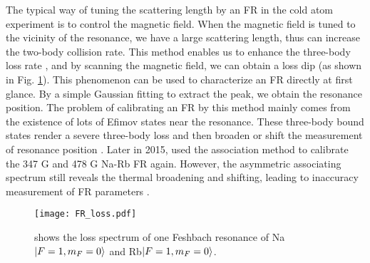 The typical way of tuning the scattering length by an FR in the cold atom experiment is to control the magnetic field. When the magnetic field is tuned to the vicinity of the resonance, we have a large scattering length, thus can increase the two-body collision rate. This method enables us to enhance the three-body loss rate \cite{wang2013observation}, and by scanning the magnetic field, we can obtain a loss dip (as shown in Fig. \ref{FR_loss}). This phenomenon can be used to characterize an FR directly at first glance. By a simple Gaussian fitting to extract the peak, we obtain the resonance position. The problem of calibrating an FR by this method mainly comes from the existence of lots of Efimov states near the resonance. These three-body bound states render a severe three-body loss and then broaden or shift the measurement of resonance position \cite{RevModPhys.82.1225}. Later in 2015, \cite{wang2015formation} used the association method to calibrate the 347 G and 478 G Na-Rb FR again. However, the asymmetric associating spectrum still reveals the thermal broadening and shifting, leading to inaccuracy measurement of FR parameters \cite{Bartenstein2005, Zurn2013}.

\begin{figure}[htb]
\begin{center}
\texttt{[image: FR\_loss.pdf]}
\end{center}
\caption[One example of loss spectrum of Feshbach resonance.]{shows the loss spectrum of one Feshbach resonance of Na$\ket{F=1,m_F=0}$ and Rb$\ket{F=1,m_F=0}$.}
\label{FR_loss}
\end{figure}

